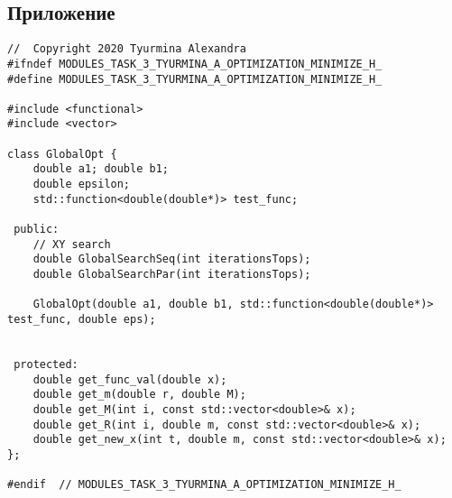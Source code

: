 \documentclass[a4paper]{report}
\begin{document}
\begin{center}
\section*{Приложение}
\end{center}
\begin{lstlisting}
//  Copyright 2020 Tyurmina Alexandra
#ifndef MODULES_TASK_3_TYURMINA_A_OPTIMIZATION_MINIMIZE_H_
#define MODULES_TASK_3_TYURMINA_A_OPTIMIZATION_MINIMIZE_H_

#include <functional>
#include <vector>

class GlobalOpt {
    double a1; double b1;
    double epsilon;
    std::function<double(double*)> test_func;

 public:
    // XY search
    double GlobalSearchSeq(int iterationsTops);
    double GlobalSearchPar(int iterationsTops);

    GlobalOpt(double a1, double b1, std::function<double(double*)> test_func, double eps);


 protected:
    double get_func_val(double x);
    double get_m(double r, double M);
    double get_M(int i, const std::vector<double>& x);
    double get_R(int i, double m, const std::vector<double>& x);
    double get_new_x(int t, double m, const std::vector<double>& x);
};

#endif  // MODULES_TASK_3_TYURMINA_A_OPTIMIZATION_MINIMIZE_H_
\end{lstlisting}
\end{document}
